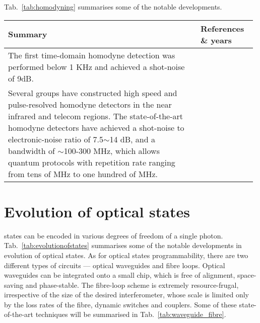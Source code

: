 Tab.~\ref{tab:homodyning} summarises some of the notable developments.

\begin{table*}[!htbp]
	\begin{tabular}{|p{0.755\linewidth}|p{0.22\linewidth}|}
		\hline
		Summary & References \& years \\
		\hline \hline
		The first time-domain homodyne detection was performed below 1 KHz and achieved a shot-noise of 9dB. & \cite{bib:Smithey1993} \\
		\hline
		Several groups have constructed high speed and pulse-resolved homodyne detectors in the near infrared and telecom regions. The state-of-the-art homodyne detectors have achieved a shot-noise to electronic-noise ratio of 7.5$\sim$14 dB, and a bandwidth of $\sim$100-300 MHz, which allows quantum protocols with repetition rate ranging from tens of MHz to one hundred of MHz. & \cite{bib:zavatta2002time, bib:okubo2008pulse, bib:kumar2012versatile, bib:chi2011balanced, bib:duan2013} \\
		\hline
	\end{tabular}
	\captionspacetab \caption{Some of state-of-the-art homodyne detectors} \label{tab:homodyning}
\end{table*}

%
%

\section{Evolution of optical states}  \label{sec:LO_evolution}

 states can be encoded in various degrees of freedom of a single photon. Tab.~\ref{tab:evolutionofstates} summarises some of the notable developments in evolution of optical states. As for optical states programmability, there are two different types of circuits --- optical waveguides and fibre loops. Optical waveguides can be integrated onto a small chip, which is free of alignment, space-saving and phase-stable. The fibre-loop scheme is extremely resource-frugal, irrespective of the size of the desired interferometer, whose scale is limited only by the loss rates of the fibre, dynamic switches and couplers. Some of these state-of-the-art techniques will be summarised in Tab.~\ref{tab:waveguide_fibre}.


